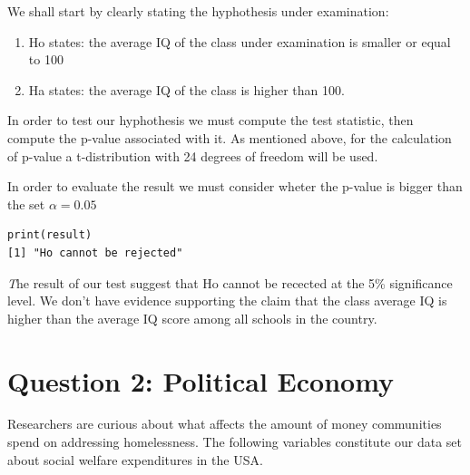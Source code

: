 \documentclass[12pt,letterpaper]{article}
\begin{document}
\vspace{0.5cm}
\noindent We shall start by clearly stating the hyphothesis under examination: \\
\vspace{.5cm}
\begin{enumerate}
	\item Ho states: the average IQ of the class under examination is smaller or equal to 100\\
	\item Ha states: the average IQ of the class is higher than 100.\\ 
\end{enumerate}
\vspace{.5cm}
\noindent In order to test our hyphothesis we must compute the test statistic, then compute the p-value associated with it. As mentioned above, for the calculation of p-value a t-distribution with 24 degrees of freedom will be used. \\
\vspace{.5cm}
 
\vspace{.5cm}
\noindent In order to evaluate the result we must consider wheter the p-value is bigger than the set $\alpha=0.05$ \\
\vspace{.5cm}
 
\begin{verbatim}
print(result)
[1] "Ho cannot be rejected"
\end{verbatim}
\textit The result of our test suggest that Ho cannot be recected at the 5\% significance level. We don't have evidence supporting the claim that the class average IQ is higher than the average IQ score among all schools in the country. \\ 

\newpage

	\section*{Question 2: Political Economy}

\noindent Researchers are curious about what affects the amount of money communities spend on addressing homelessness. The following variables constitute our data set about social welfare expenditures in the USA. \\
\vspace{.5cm}
\end{document}
